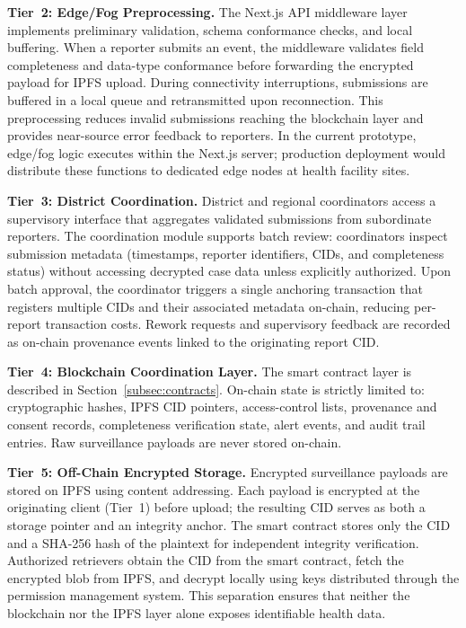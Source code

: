 \textbf{Tier~2: Edge/Fog Preprocessing.} The Next.js API middleware layer implements preliminary validation, schema conformance checks, and local buffering. When a reporter submits an event, the middleware validates field completeness and data-type conformance before forwarding the encrypted payload for IPFS upload. During connectivity interruptions, submissions are buffered in a local queue and retransmitted upon reconnection. This preprocessing reduces invalid submissions reaching the blockchain layer and provides near-source error feedback to reporters. In the current prototype, edge/fog logic executes within the Next.js server; production deployment would distribute these functions to dedicated edge nodes at health facility sites.

\textbf{Tier~3: District Coordination.} District and regional coordinators access a supervisory interface that aggregates validated submissions from subordinate reporters. The coordination module supports batch review: coordinators inspect submission metadata (timestamps, reporter identifiers, CIDs, and completeness status) without accessing decrypted case data unless explicitly authorized. Upon batch approval, the coordinator triggers a single anchoring transaction that registers multiple CIDs and their associated metadata on-chain, reducing per-report transaction costs. Rework requests and supervisory feedback are recorded as on-chain provenance events linked to the originating report CID.

\textbf{Tier~4: Blockchain Coordination Layer.} The smart contract layer is described in Section~\ref{subsec:contracts}. On-chain state is strictly limited to: cryptographic hashes, IPFS CID pointers, access-control lists, provenance and consent records, completeness verification state, alert events, and audit trail entries. Raw surveillance payloads are never stored on-chain.

\textbf{Tier~5: Off-Chain Encrypted Storage.} Encrypted surveillance payloads are stored on IPFS using content addressing. Each payload is encrypted at the originating client (Tier~1) before upload; the resulting CID serves as both a storage pointer and an integrity anchor. The smart contract stores only the CID and a SHA-256 hash of the plaintext for independent integrity verification. Authorized retrievers obtain the CID from the smart contract, fetch the encrypted blob from IPFS, and decrypt locally using keys distributed through the permission management system. This separation ensures that neither the blockchain nor the IPFS layer alone exposes identifiable health data.

